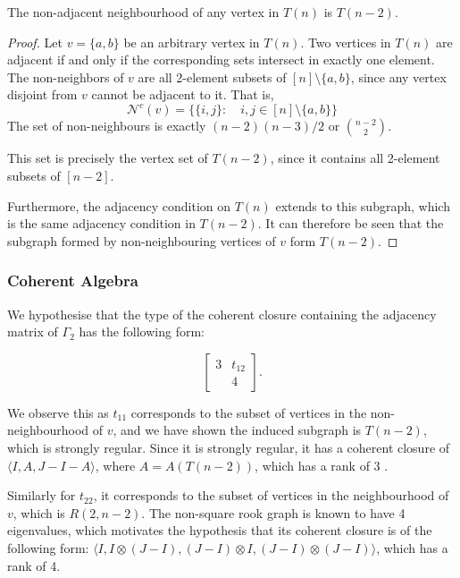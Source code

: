 \begin{proposition}
    The non-adjacent neighbourhood of any vertex in $T(n)$ is $T(n-2)$.
\end{proposition}
\begin{proof}
    Let $v = \{a,b\}$ be an arbitrary vertex in $T(n)$. Two vertices in $T(n)$ are adjacent if and only if the corresponding sets intersect in exactly one element. The non-neighbors of $v$ are all 2-element subsets of $[n] \setminus \{a, b\} $, since any vertex disjoint from $v$ cannot be adjacent to it. That is,
    \begin{equation*}
        \mathcal{N}^c(v) = \{\{i,j\}:\quad i,j\in[n]\setminus\{a,b\}\}
    \end{equation*}
    The set of non-neighbours is exactly $(n-2)(n-3)/2$ or $\binom{n-2}{2}$.

    This set is precisely the vertex set of $T(n-2)$, since it contains all 2-element subsets of $[n-2]$.

    Furthermore, the adjacency condition on $T(n)$ extends to this subgraph, which is the same adjacency condition in $T(n-2)$. It can therefore be seen that the subgraph formed by non-neighbouring vertices of $v$ form $T(n-2)$.
\end{proof}

\subsubsection{Coherent Algebra}

We hypothesise that the type of the coherent closure containing the adjacency matrix of $\Gamma_2$ has the following form:

\begin{equation*}
    \begin{bmatrix}
        3 & t_{12}\\
          & 4
    \end{bmatrix}.
\end{equation*}

We observe this as $t_{11}$ corresponds to the subset of vertices in the non-neighbourhood of $v$, and we have shown the induced subgraph is $T(n-2)$, which is strongly regular. Since it is strongly regular, it has a coherent closure of $\langle I,A, J-I-A\rangle$, where $A=A(T(n-2))$, which has a rank of 3 \cite{greaves2024coherentrankgrapheigenvalues}.

Similarly for $t_{22}$, it corresponds to the subset of vertices in the neighbourhood of $v$, which is $R(2,n-2)$. The non-square rook graph is known to have 4 eigenvalues, which motivates the hypothesis that its coherent closure is of the following form: $\langle I, I\otimes(J-I),(J-I)\otimes I, (J-I)\otimes(J-I) \rangle$, which has a rank of 4.

